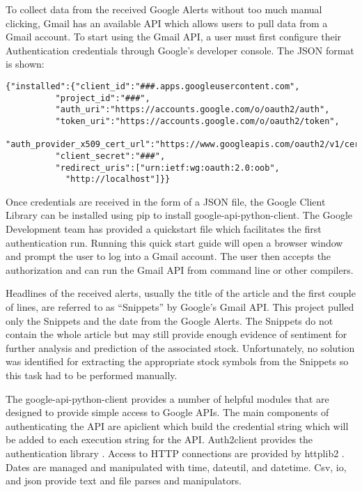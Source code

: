 \documentclass[sigconf]{acmart}
\begin{document}
To collect data from the received Google Alerts without too much manual clicking, Gmail has an available API which allows users to pull data from a Gmail account. To start using the Gmail API, a user must first configure their Authentication credentials through Google's developer console. The JSON format is shown:
\begin{lstlisting}
{"installed":{"client_id":"###.apps.googleusercontent.com",
		  "project_id":"###",
		  "auth_uri":"https://accounts.google.com/o/oauth2/auth",
		  "token_uri":"https://accounts.google.com/o/oauth2/token",
		  "auth_provider_x509_cert_url":"https://www.googleapis.com/oauth2/v1/certs",
		  "client_secret":"###",
		  "redirect_uris":["urn:ietf:wg:oauth:2.0:oob",
			"http://localhost"]}}
\end{lstlisting}
Once credentials are received in the form of a JSON file, the Google Client Library can be installed using pip to install google-api-python-client. The Google Development team has provided a quickstart file which facilitates the first authentication run. Running this quick start guide will open a browser window and prompt the user to log into a Gmail account. The user then accepts the authorization and can run the Gmail API from command line or other compilers. 

 Headlines of the received alerts, usually the title of the article and the first couple of lines, are referred to as ``Snippets'' by Google's Gmail API. This project pulled only the Snippets and the date from the Google Alerts. The Snippets do not contain the whole article but may still provide enough evidence of sentiment for further analysis and prediction of the associated stock. Unfortunately, no solution was identified for extracting the appropriate stock symbols from the Snippets so this task had to be performed manually. 

The google-api-python-client provides a number of helpful modules that are designed to provide simple access to Google APIs. The main components of authenticating the API are apiclient which build the credential string which will be added to each execution string for the API. Auth2client provides the authentication library \cite{www-apiAccess}. Access to HTTP connections are provided by httplib2 \cite{www-http}. Dates are managed and manipulated with time, dateutil, and datetime. Csv, io, and json provide text and file parses and manipulators. 
\end{document}
